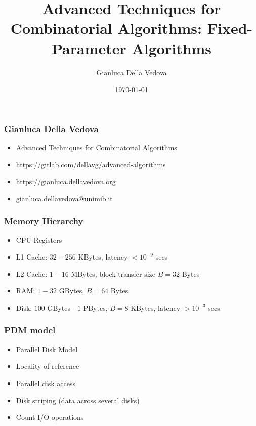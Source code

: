 \documentclass[12pt,aspectratio=169]{beamer}
\author{Gianluca Della Vedova}
\title[Advanced Algorithms]{Advanced Techniques for Combinatorial Algorithms:
Fixed-Parameter Algorithms}
\institute[]{Univ. Milano--Bicocca\\
  \texttt{https://gianluca.dellavedova.org}}
\date[]{{\tiny \today\hspace{1em} \vcsShortHash}}
\begin{document}
\begin{frame}
  \titlepage
\end{frame}


\begin{frame}\frametitle{Gianluca Della Vedova}
  \begin{itemize}
  \item
                Advanced Techniques for Combinatorial Algorithms
\item
{\small\url{https://gitlab.com/dellavg/advanced-algorithms}}
  \item
{\small\url{https://gianluca.dellavedova.org}}
  \item
{\small\url{gianluca.dellavedova@unimib.it}}
  \end{itemize}
\end{frame}



\begin{frame}\frametitle{Memory Hierarchy}
  \begin{itemize}
  \item
    CPU Registers
  \item
    L1 Cache: $32-256$ KBytes, latency $< 10^{-9}$ secs
  \item
    L2 Cache: $1-16$ MBytes, block transfer size $B=32$ Bytes
  \item
    RAM: $1-32$ GBytes,  $B=64$ Bytes
  \item
    Disk: $100$ GBytes - $1$ PBytes,  $B=8$ KBytes, latency $> 10^{-3}$ secs
  \end{itemize}
\end{frame}


\begin{frame}\frametitle{PDM model}
  \begin{itemize}
  \item
    Parallel Disk Model
  \item
    Locality of reference
  \item
    Parallel disk access
  \item
    Disk striping (data across several disks)
  \item
    Count \alert{I/O operations}
  \end{itemize}
\end{frame}
\end{document}
